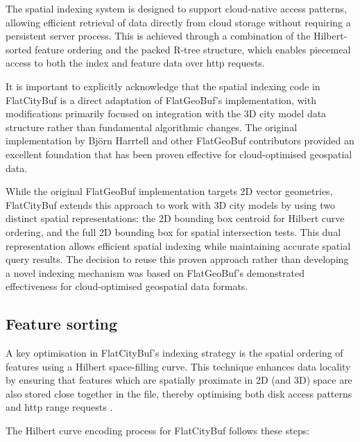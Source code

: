The spatial indexing system is designed to support cloud-native access patterns, allowing efficient retrieval of data directly from cloud storage without requiring a persistent server process. This is achieved through a combination of the Hilbert-sorted feature ordering and the packed R-tree structure, which enables piecemeal access to both the index and feature data over \ac{http} requests.

It is important to explicitly acknowledge that the spatial indexing code in FlatCityBuf is a direct adaptation of FlatGeoBuf's implementation, with modifications primarily focused on integration with the 3D city model data structure rather than fundamental algorithmic changes. The original implementation by Björn Harrtell and other FlatGeoBuf contributors \citep{flatgeobuf} provided an excellent foundation that has been proven effective for cloud-optimised geospatial data.

While the original FlatGeoBuf implementation targets 2D vector geometries, FlatCityBuf extends this approach to work with 3D city models by using two distinct spatial representations: the 2D bounding box centroid for Hilbert curve ordering, and the full 2D bounding box for spatial intersection tests. This dual representation allows efficient spatial indexing while maintaining accurate spatial query results. The decision to reuse this proven approach rather than developing a novel indexing mechanism was based on FlatGeoBuf's demonstrated effectiveness for cloud-optimised geospatial data formats.

\subsection{Feature sorting}
\label{methodology:spatial_index:feature_sorting}

A key optimisation in FlatCityBuf's indexing strategy is the spatial ordering of features using a Hilbert space-filling curve. This technique enhances data locality by ensuring that features which are spatially proximate in 2D (and 3D) space are also stored close together in the file, thereby optimising both disk access patterns and \ac{http} range requests \citep{horance_2022_detail}.

The Hilbert curve encoding process for FlatCityBuf follows these steps:

